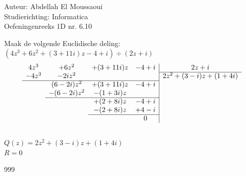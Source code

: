 \documentclass[a4paper]{article}
\begin{document}
  
\noindent \large Auteur: Abdellah El Moussaoui \\
\noindent \large Studierichting: Informatica\\
\noindent \large Oefeningenreeks 1D nr. 6.10\\

\medskip

\normalsize

Maak de volgende Euclidische deling: \\

$(4z^3 +6z^2 +(3+11i)z -4+i) \div (2z+i)$\\

\[
\begin{array}{cccc|c}
4z^3 & +6z^2 & +(3+11i)z & -4+i & 2z+i  \\ \cline{5-5}

-4z^3 & -2iz^2 &  &  & 2z^2+(3-i)z+(1+4i)  \\ \cline{1-4}

 & (6-2i)z^2 & +(3+11i)z & -4+i &    \\

 & -(6-2i)z^2 & -(1+3i)z &  &    \\ \cline{2-4}

 &  & +(2+8i)z & -4+i &    \\

 &  & -(2+8i)z & +4-i &   \\ \cline{3-4}

 &  &  & 0 & 
\end{array}
\]\\

$Q(z) = 2z^2+(3-i)z+(1+4i)$\\

$R = 0 $\\

\begin{thebibliography}{999}
\end{thebibliography}
\end{document}
